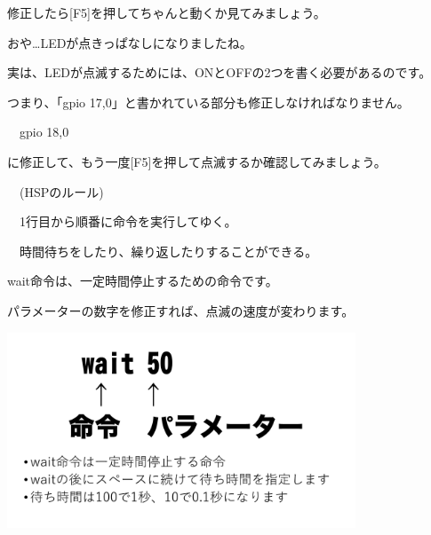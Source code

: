 \documentclass[a4paper,dvipdfmx]{jarticle}
\begin{document}
\bigskip

修正したら[F5]を押してちゃんと動くか見てみましょう。

おや…LEDが点きっぱなしになりましたね。

実は、LEDが点滅するためには、ONとOFFの2つを書く必要があるのです。

つまり、「gpio
17,0」と書かれている部分も修正しなければなりません。


\bigskip

\ \ gpio 18,0


\bigskip

に修正して、もう一度[F5]を押して点滅するか確認してみましょう。


\bigskip

\ \ (HSPのルール)


\bigskip

\ \ 1行目から順番に命令を実行してゆく。

\ \ 時間待ちをしたり、繰り返したりすることができる。


\bigskip

wait命令は、一定時間停止するための命令です。

パラメーターの数字を修正すれば、点滅の速度が変わります。



\begin{center}
\includegraphics[width=10.372cm,height=5.837cm]{text02-img/text02-img026.png}

\end{center}

\bigskip


\bigskip


\bigskip


\bigskip


\bigskip


\bigskip


\bigskip


\bigskip
\end{document}

